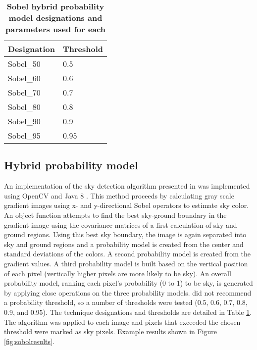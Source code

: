 \documentclass[final,3p,times,authoryear]{elsarticle}
\begin{document}
	
	

\begin{table}[!htbp]
\caption{\bf Sobel hybrid probability model designations and parameters used for each  \label{tab:techniques4}}     
\begin{tabular}{ l  l }
\textbf{Designation}  & \textbf{Threshold}    \\ \hline
Sobel\_50 & 0.5 \\	  
Sobel\_60 & 0.6 \\	
Sobel\_70 & 0.7 \\	
Sobel\_80 & 0.8 \\
Sobel\_90 & 0.9 \\
Sobel\_95 & 0.95 \\
\hline
\end{tabular}
\end{table}

\subsection{Hybrid probability model}\label{sec:prob}
An implementation of the sky detection algorithm presented in \cite{Wang2015a} was implemented using OpenCV \citep{Bradski2000} and Java 8 \citep{Oracle2018}. This method proceeds by calculating gray scale gradient images using x- and y-directional Sobel operators to estimate sky color. An object function attempts to find the best sky-ground boundary in the gradient image using the covariance matrices of a first calculation of sky and ground regions. Using this best sky boundary, the image is again separated into sky and ground regions and a probability model is created from the center and standard deviations of the colors. A second probability model is created from the gradient values. A third probability model is built based on the vertical position of each pixel (vertically higher pixels are more likely to be sky). An overall probability model, ranking each pixel's probability (0 to 1) to be sky, is generated by applying close operations on the three probability models. \cite{Wang2015a} did not recommend a probability threshold, so a number of thresholds were tested (0.5, 0.6, 0.7, 0.8, 0.9, and 0.95). The technique designations and thresholds are detailed in Table \ref{tab:techniques4}. The algorithm was applied to each image and pixels that exceeded the chosen threshold were marked as sky pixels. Example results shown in Figure \ref{fig:sobolresults}.
\end{document}
